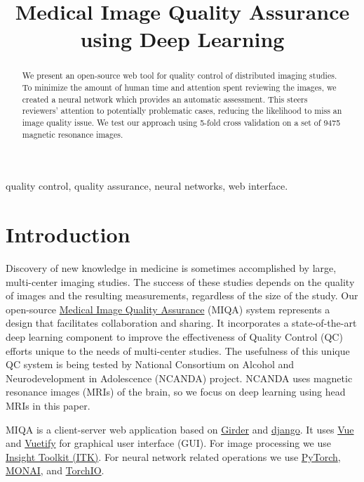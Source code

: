 \documentclass{midl} %
\title[Medical Image Quality Assurance using Deep Learning]{Medical Image Quality Assurance using Deep Learning}
\begin{document}
\maketitle

\begin{abstract}
We present an open-source web tool for quality control of distributed imaging studies.
To minimize the amount of human time and attention spent reviewing the images,
we created a neural network which provides an automatic assessment.
This steers reviewers' attention to potentially problematic cases,
reducing the likelihood to miss an image quality issue.
We test our approach using 5-fold cross validation on a set of 9475 magnetic resonance images.
\end{abstract}

\begin{keywords}
quality control, quality assurance, neural networks, web interface.
\end{keywords}

\section{Introduction}

Discovery of new knowledge in medicine is sometimes accomplished by large, multi-center imaging studies. The success of these studies depends on the quality of images and the resulting measurements, regardless of the size of the study.
Our open-source \href{https://github.com/OpenImaging/miqa}{Medical Image Quality Assurance} (MIQA) system represents a design that facilitates collaboration and sharing. It incorporates a state-of-the-art deep learning component to improve the effectiveness of Quality Control (QC) efforts unique to the needs of multi-center studies. The usefulness of this unique QC system is being tested by National Consortium on Alcohol and Neurodevelopment in Adolescence (NCANDA) project. NCANDA uses magnetic resonance images (MRIs) of the brain, so we focus on deep learning using head MRIs in this paper.

MIQA is a client-server web application based on \href{https://github.com/girder/girder}{Girder} and \href{https://www.django-rest-framework.org/}{django}. It uses \href{https://vuejs.org/}{Vue} and \href{https://vuetifyjs.com/}{Vuetify} for graphical user interface (GUI). For image processing we use \href{https://itk.org/}{Insight Toolkit (ITK)}. For neural network related operations we use \href{https://pytorch.org/}{PyTorch}, \href{https://monai.io/}{MONAI}, and \href{https://torchio.readthedocs.io/}{TorchIO}.
\end{document}
